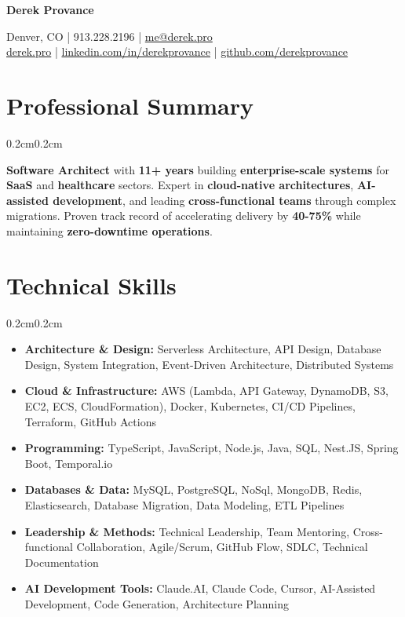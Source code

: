 \documentclass[10pt, letterpaper]{article}
\newenvironment{onecolentry}{
    \begin{adjustwidth}{0.2cm}{0.2cm}
}{
    \end{adjustwidth}
}
\newenvironment{header}{
    \setlength{\topsep}{0pt}\par\kern\topsep\centering\linespread{1.5}
}{
    \par\kern\topsep
}
\newcommand{\placelastupdatedtext}{
  \AddToShipoutPicture*{
    \put(
        \LenToUnit{\paperwidth-2 cm-0.2 cm+0.05cm},
        \LenToUnit{\paperheight-1.0 cm}
    ){\vtop{{\null}\makebox[0pt][c]{
        \small\color{gray}\textit{Last updated: \monthname\ \the\year}
    }}}
  }
}
\let\hrefWithoutArrow\href
\begin{document}
\placelastupdatedtext
\begin{header}
    {\fontsize{24pt}{28pt}\selectfont\textbf{Derek Provance}}
    \vspace{0.2cm}

    \normalsize
    Denver, CO | 913.228.2196 | \hrefWithoutArrow{mailto:me@derek.pro}{me@derek.pro} \\
    \hrefWithoutArrow{https://derek.pro}{derek.pro} | \hrefWithoutArrow{https://linkedin.com/in/derekprovance}{linkedin.com/in/derekprovance} | \hrefWithoutArrow{https://github.com/derekprovance}{github.com/derekprovance}
\end{header}

\vspace{0.2cm}

\section{Professional Summary}
\begin{onecolentry}
    \textbf{Software Architect} with \textbf{11+ years} building \textbf{enterprise-scale systems} for \textbf{SaaS} and \textbf{healthcare} sectors. Expert in \textbf{cloud-native architectures}, \textbf{AI-assisted development}, and leading \textbf{cross-functional teams} through complex migrations. Proven track record of accelerating delivery by \textbf{40-75\%} while maintaining \textbf{zero-downtime operations}.
\end{onecolentry}

\section{Technical Skills}
\begin{onecolentry}
\begin{itemize}[leftmargin=0.5cm]
    \item \textbf{Architecture \& Design:} Serverless Architecture, API Design, Database Design, System Integration, Event-Driven Architecture, Distributed Systems
    \item \textbf{Cloud \& Infrastructure:} AWS (Lambda, API Gateway, DynamoDB, S3, EC2, ECS, CloudFormation), Docker, Kubernetes, CI/CD Pipelines, Terraform, GitHub Actions
    \item \textbf{Programming:} TypeScript, JavaScript, Node.js, Java, SQL, Nest.JS, Spring Boot, Temporal.io
    \item \textbf{Databases \& Data:} MySQL, PostgreSQL, NoSql, MongoDB, Redis, Elasticsearch, Database Migration, Data Modeling, ETL Pipelines
    \item \textbf{Leadership \& Methods:} Technical Leadership, Team Mentoring, Cross-functional Collaboration, Agile/Scrum, GitHub Flow, SDLC, Technical Documentation
    \item \textbf{AI Development Tools:} Claude.AI, Claude Code, Cursor, AI-Assisted Development, Code Generation, Architecture Planning
\end{itemize}
\end{onecolentry}
\end{document}
